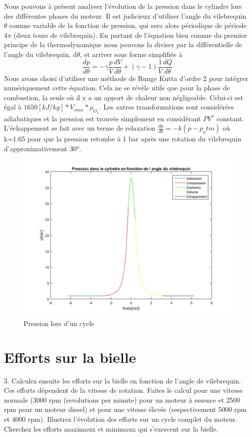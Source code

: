 \documentclass[a4paper,oneside,12pt]{report}
\begin{document}
Nous pouvons à présent analyser l'évolution de la pression dans le cylindre lors des différentes phases du moteur. Il est judicieux d'utiliser l'angle du vilebrequin $\theta$ comme variable de la fonction de pression, qui sera alors périodique de période 4$\pi$ (deux tours de vilebrequin). En partant de l'équation bien connue du premier principe de la thermodynamique nous pouvons la diviser par la différentielle de l'angle du vilebrequin, d$\theta$, et arriver sous forme simplifiée à
$$\frac{dp}{d\theta}=-\gamma\frac{p}{V}\frac{dV}{d\theta}+(\gamma - 1) \frac{1}{V}\frac{dQ}{d\theta}$$
Nous avons choisi d'utiliser une méthode de Runge Kutta d'ordre 2 pour intégrer numériquement cette équation. Cela ne se révèle utile que pour la phase de combustion, la seule où il y a un apport de chaleur non négligeable. Celui-ci est égal à $1650[kJ/kg] * V_{max} * \rho_{O_2}$. Les autres transformations sont considérées adiabatiques et la pression est trouvée simplement en considérant $PV^{\gamma}$ constant. L'échappement se fait avec un terme de relaxation $\frac{dp}{d\theta}=-k(p-p_atm)$ où k=1.65 pour que la pression retombe à 1 bar après une rotation du vilebrequin d'approximativement 30°.

\begin{figure}	
	\center
	\includegraphics[scale=0.3]{Pression.jpg}
	\caption{Pression lors d'un cycle}
\end{figure}

\section{Efforts sur la bielle}
3. Calculez ensuite les efforts sur la bielle en fonction de l’angle de vilebrequin.
Ces efforts dépendent de la vitesse de rotation. Faites le calcul pour une vitesse
normale (3000 rpm (revolutions per minute) pour un moteur à essence et 2500
rpm pour un moteur diesel) et pour une vitesse élevée (respectivement 5000 rpm
et 4000 rpm). Illustrez l’évolution des efforts sur un cycle complet du moteur.
Cherchez les efforts maximaux et minimaux qui s’exercent sur la bielle.
\end{document}
